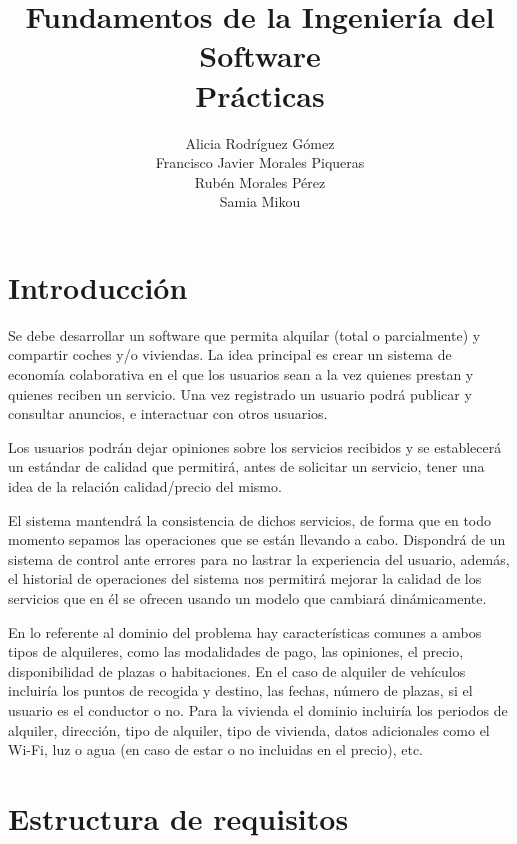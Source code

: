 \documentclass[11pt,spanish]{article} %
\title{Fundamentos de la Ingeniería del Software \\ Prácticas}
\author{Alicia Rodríguez Gómez \\ Francisco Javier Morales Piqueras\\ Rubén Morales Pérez\\ Samia Mikou}
\date{ }
\begin{document}
\maketitle
\tableofcontents %
\newpage
\setlength\parindent{0pt} %


\section{Introducción}
\hspace{0.5cm}Se debe desarrollar un software que permita alquilar (total o parcialmente) y compartir coches y/o viviendas. 
La idea principal es crear un sistema de economía colaborativa en el que los usuarios sean a la vez quienes prestan y quienes reciben un servicio. 
Una vez registrado un usuario podrá publicar y consultar anuncios, e interactuar con otros usuarios.

\hspace{0.5cm}Los usuarios podrán dejar opiniones sobre los servicios recibidos y se establecerá un estándar de calidad que permitirá, antes de solicitar un servicio, tener una idea de la relación calidad/precio del mismo.

\hspace{0.5cm}El sistema mantendrá la consistencia de dichos servicios, de forma que en todo momento sepamos las operaciones que se están llevando a cabo.
Dispondrá de un sistema de control ante errores para no lastrar la experiencia del usuario, además, el historial de operaciones del sistema nos permitirá mejorar la calidad de los servicios que en él se ofrecen usando un modelo que cambiará dinámicamente.

\hspace{0.5cm}En lo referente al dominio del problema hay características comunes a ambos tipos de alquileres, como las modalidades de pago, las opiniones, el precio, disponibilidad de plazas o habitaciones.
En el caso de alquiler de vehículos incluiría los puntos de recogida y destino, las fechas, número de plazas, si el usuario es el conductor o no.
Para la vivienda el dominio incluiría los periodos de alquiler, dirección, tipo de alquiler, tipo de vivienda, datos adicionales como el Wi-Fi, luz o agua (en caso de estar o no incluidas en el precio), etc.


\section{Estructura de requisitos}
\end{document}
